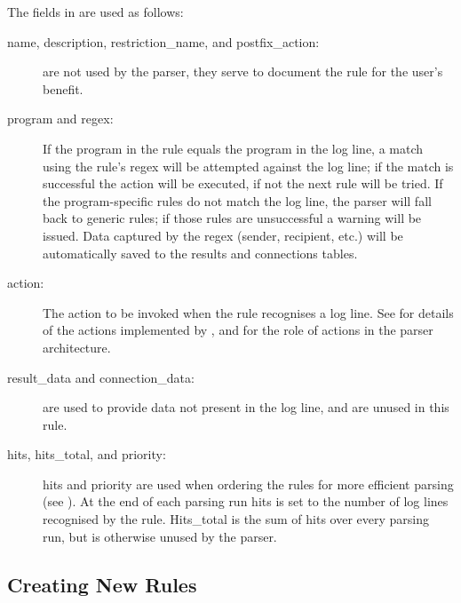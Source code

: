 The fields in  are used as
follows:

\begin{description}

    \item [name, description, restriction\_name, and postfix\_action:] are
        not \newline{} used by the parser, they serve to document the rule
        for the user's benefit.

    \item [program and regex:] If the program in the rule equals the
        program in the log line, a match using the rule's regex will be
        attempted against the log line; if the match is successful the
        action will be executed, if not the next rule will be tried.  If
        the program-specific rules do not match the log line, the parser
        will fall back to generic rules; if those rules are unsuccessful a
        warning will be issued.  Data captured by the regex (sender,
        recipient, etc.) will be automatically saved to the results and
        connections tables.

    \item [action:] The action to be invoked when the rule recognises a log
        line.  See  for
        details of the actions implemented by \parsername{}, and
         for the role of actions in the
        parser architecture.

    \item [result\_data and connection\_data:] are used to provide data not
        present in the log line, and are unused in this rule.

    \item [hits, hits\_total, and priority:] hits and priority are used
        when ordering the rules for more efficient parsing (see
        ).  At the end of each
        parsing run hits is set to the number of log lines recognised by
        the rule.  Hits\_total is the sum of hits over every parsing run,
        but is otherwise unused by the parser.

\end{description}

\subsection{Creating New Rules}

